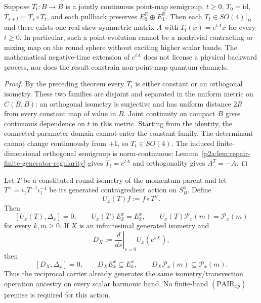 \documentclass[12pt,a4paper]{article}
\begin{document}
\begin{corollary}
\label{p2c:cor:v280-first-band-semigroup-rigidity}
Suppose $T_t:B\to B$ is a jointly continuous point-map semigroup,
$t\ge0$, $T_0=\mathrm{id}$, $T_{s+t}=T_s\circ T_t$, and each pullback
preserves $E_0^{\mathbb R}\oplus E_1^{\mathbb R}$.  Then each
$T_t\in SO(4)|_B$ and there exists one real skew-symmetric matrix $A$
with $T_t(x)=e^{tA}x$ for every $t\ge0$.  In particular, such a
point-evolution cannot be a nontrivial contracting or mixing map on the
round sphere without exciting higher scalar bands.  The mathematical
negative-time extension of $e^{tA}$ does not license a physical backward
process, nor does the result constrain non-point-map quantum channels.
\end{corollary}
\begin{proof}
By the preceding theorem every $T_t$ is either constant or an orthogonal
isometry.  These two families are disjoint and separated in the uniform
metric on $C(B,B)$: an orthogonal isometry is surjective and has uniform
distance $2R$ from every constant map of value in $B$.  Joint continuity
on compact $B$ gives continuous dependence on $t$ in this metric.
Starting from the identity, the connected parameter domain cannot enter
the constant family.  The determinant cannot change continuously from
$+1$, so $T_t\in SO(4)$.  The induced finite-dimensional orthogonal
semigroup is norm-continuous; Lemma~\ref{p2a:lem:repair-finite-generator-regularity}
gives $T_t=e^{tA}$ and orthogonality gives $A^T=-A$.
\end{proof}

\begin{theorem}
\label{p2c:thm:all-band-reciprocal-covariance}
Let \(T\) be a constituted round isometry of the momentum parent and let
\(T^\vee=\iota_1T^{-1}\iota_1^{-1}\) be its generated contragredient action on
\(S_B^3\).  Define
\[
 U_x(T)f:=f\circ T^\vee .
\]
Then
\[
 [U_x(T),\Delta_x]=0,
 \qquad
 U_x(T)E_k^x=E_k^x,
 \qquad
 U_x(T)\mathcal P_x(m)=\mathcal P_x(m)
\]
for every \(k,m\ge0\).  If \(X\) is an infinitesimal generated isometry and
\[
 D_X:=\left.\frac{d}{ds}\right|_{s=0}U_x(e^{sX}),
\]
then
\[
 [D_X,\Delta_x]=0,
 \qquad
 D_XE_k^x\subseteq E_k^x,
 \qquad
 D_X\mathcal P_x(m)\subseteq\mathcal P_x(m).
\]
Thus the reciprocal carrier already generates the same isometry/transvection
operation ancestry on every scalar harmonic band.  No finite-band
\((\mathrm{PAIR}_{xp})\) premise is required for this action.
\end{theorem}
\end{document}
